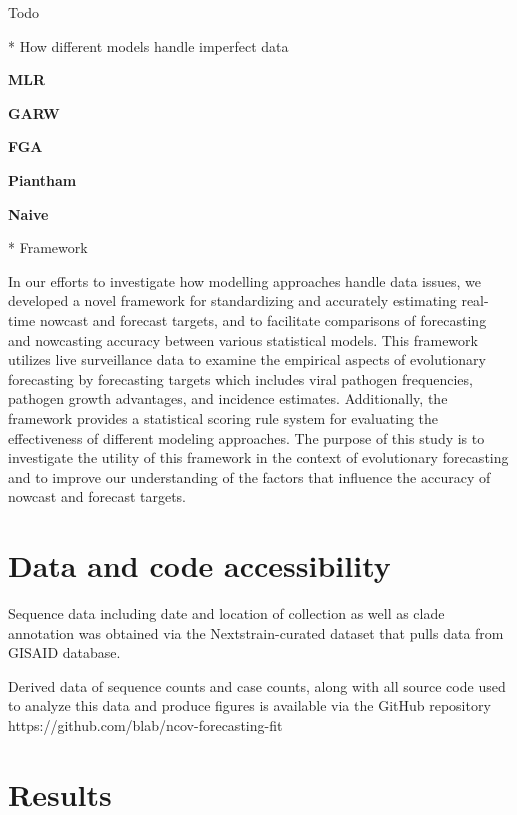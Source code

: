 \documentclass[11pt,oneside,letterpaper]{article}
\begin{document}
Todo



* How different models handle imperfect data

\textbf{MLR}

\textbf{GARW}

\textbf{FGA}

\textbf{Piantham}

\textbf{Naive}


* Framework

In our efforts to investigate how modelling approaches handle data issues, we developed a novel framework for standardizing and accurately estimating real-time nowcast and forecast targets, and to facilitate comparisons of forecasting and nowcasting accuracy between various statistical models.
This framework utilizes live surveillance data to examine the empirical aspects of evolutionary forecasting by forecasting targets which includes viral pathogen frequencies, pathogen growth advantages, and incidence estimates. 
Additionally, the framework provides a statistical scoring rule system for evaluating the effectiveness of different modeling approaches.
The purpose of this study is to investigate the utility of this framework in the context of evolutionary forecasting and to improve our understanding of the factors that influence the accuracy of nowcast and forecast targets.








\section*{Data and code accessibility}

Sequence data including date and location of collection as well as clade annotation was obtained via the Nextstrain-curated
dataset that pulls data from GISAID database. 



Derived data of sequence counts and case counts, along with all source code used to analyze
this data and produce figures is available via the GitHub repository https://github.com/blab/ncov-forecasting-fit





\section*{Results}
\end{document}
